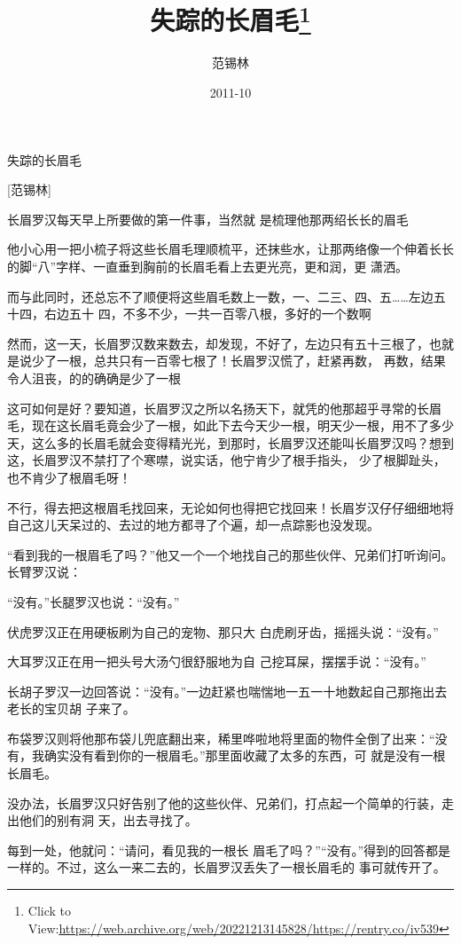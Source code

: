 \documentclass{article}
\title{失踪的长眉毛\footnote{Click to View:\url{https://web.archive.org/web/20221213145828/https://rentry.co/iv539}}}
\author{范锡林}
\date{2011-10}
\begin{document}

\maketitle


\Large

﻿失踪的长眉毛

[范锡林] 

长眉罗汉每天早上所要做的第一件事，当然就
是梳理他那两绍长长的眉毛 

他小心用一把小梳子将这些长眉毛理顺梳平，还抹些水，让那两络像一个伸着长长的脚“八”字样、一直垂到胸前的长眉毛看上去更光亮，更和润，更
潇洒。 

而与此同时，还总忘不了顺便将这些眉毛数上一数，一、二三、四、五……左边五十四，右边五十
四，不多不少，一共一百零八根，多好的一个数啊 

\newpage

然而，这一天，长眉罗汉数来数去，却发现，不好了，左边只有五十三根了，也就是说少了一根，总共只有一百零七根了！长眉罗汉慌了，赶紧再数，
再数，结果令人沮丧，的的确确是少了一根 

这可如何是好？要知道，长眉罗汉之所以名扬天下，就凭的他那超乎寻常的长眉毛，现在这长眉毛竟会少了一根，如此下去今天少一根，明天少一根，用不了多少天，这么多的长眉毛就会变得精光光，到那时，长眉罗汉还能叫长眉罗汉吗？想到这，长眉罗汉不禁打了个寒噤，说实话，他宁肯少了根手指头，
少了根脚趾头，也不肯少了根眉毛呀！ 

不行，得去把这根眉毛找回来，无论如何也得把它找回来！长眉岁汉仔仔细细地将自己这儿天呆过的、去过的地方都寻了个遍，却一点踪影也没发现。
 

“看到我的一根眉毛了吗？”他又一个一个地找自己的那些伙伴、兄弟们打听询问。长臂罗汉说：

\newpage
“没有。”长腿罗汉也说：“没有。” 

伏虎罗汉正在用硬板刷为自己的宠物、那只大
白虎刷牙齿，摇摇头说：“没有。” 

大耳罗汉正在用一把头号大汤勺很舒服地为自
己挖耳屎，摆摆手说：“没有。” 

长胡子罗汉一边回答说：“没有。”一边赶紧也喘惴地一五一十地数起自己那拖出去老长的宝贝胡
子来了。 

布袋罗汉则将他那布袋儿兜底翻出来，稀里哗啦地将里面的物件全倒了出来：“没有，我确实没有看到你的一根眉毛。”那里面收藏了太多的东西，可
就是没有一根长眉毛。 

没办法，长眉罗汉只好告别了他的这些伙伴、兄弟们，打点起一个简单的行装，走出他们的别有洞
天，出去寻找了。 

每到一处，他就问：“请问，看见我的一根长
\newpage
眉毛了吗？”“没有。”得到的回答都是一样的。不过，这么一来二去的，长眉罗汉丢失了一根长眉毛的
事可就传开了。 
\end{document}

